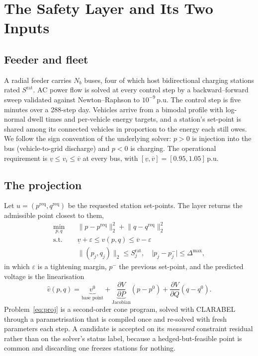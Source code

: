 \documentclass[conference,a4paper]{IEEEtran}
\begin{document}
\section{The Safety Layer and Its Two Inputs}

\subsection{Feeder and fleet}

A radial feeder carries $N_b$ buses, four of which host bidirectional charging
stations rated $S^{\mathrm{rat}}$. AC power flow is solved at every control step
by a backward--forward sweep validated against Newton--Raphson to
$10^{-9}$\,p.u. The control step is five minutes over a 288-step day. Vehicles
arrive from a bimodal profile with log-normal dwell times and per-vehicle energy
targets, and a station's set-point is shared among its connected vehicles in
proportion to the energy each still owes. We follow the sign convention of the
underlying solver: $p > 0$ is injection into the bus (vehicle-to-grid discharge)
and $p < 0$ is charging. The operational requirement is
$\underline{v} \le v_i \le \overline{v}$ at every bus, with
$[\underline{v}, \overline{v}] = [0.95, 1.05]$\,p.u.

\subsection{The projection}

Let $u = (p^{\mathrm{req}}, q^{\mathrm{req}})$ be the requested station
set-points. The layer returns the admissible point closest to them,
%
\begin{align}
\min_{p,q} \quad & \lVert p - p^{\mathrm{req}} \rVert_2^2
                 + \lVert q - q^{\mathrm{req}} \rVert_2^2 \label{eq:proj}\\
\text{s.t.}\quad
& \underline{v} + \varepsilon \le \hat v(p,q) \le \overline{v} - \varepsilon
  \nonumber\\
& \lVert (p_j, q_j) \rVert_2 \le S^{\mathrm{rat}}_j, \quad
  \lvert p_j - p_j^{-} \rvert \le \Delta^{\max}, \nonumber
\end{align}
%
in which $\varepsilon$ is a tightening margin, $p^{-}$ the previous set-point,
and the predicted voltage is the linearisation
%
\begin{equation}
\hat v(p,q) = \underbrace{v^{0}}_{\text{base point}}
  + \underbrace{\frac{\partial V}{\partial P}}_{\text{Jacobian}}(p - p^{0})
  + \frac{\partial V}{\partial Q}(q - q^{0}).
\label{eq:lin}
\end{equation}
%
Problem~\eqref{eq:proj} is a second-order cone program, solved with CLARABEL
through a parametrisation that is compiled once and re-solved with fresh
parameters each step. A candidate is accepted on its \emph{measured} constraint
residual rather than on the solver's status label, because a hedged-but-feasible
point is common and discarding one freezes stations for nothing.
\end{document}
